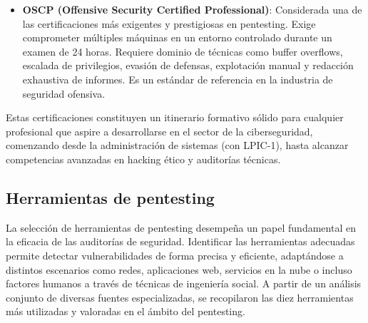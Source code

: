 \documentclass[a4paper, 10pt]{article}
\begin{document}
\begin{itemize}
            \item \textbf{OSCP (Offensive Security Certified Professional)}: Considerada una de las certificaciones más exigentes y prestigiosas en pentesting. Exige comprometer múltiples máquinas en un entorno controlado durante un examen de 24 horas. Requiere dominio de técnicas como buffer overflows, escalada de privilegios, evasión de defensas, explotación manual y redacción exhaustiva de informes. Es un estándar de referencia en la industria de seguridad ofensiva.
        \end{itemize}
        
        Estas certificaciones constituyen un itinerario formativo sólido para cualquier profesional que aspire a desarrollarse en el sector de la ciberseguridad, comenzando desde la administración de sistemas (con LPIC-1), hasta alcanzar competencias avanzadas en hacking ético y auditorías técnicas.
        
        

    \subsection{Herramientas de pentesting}

    La selección de herramientas de pentesting desempeña un papel fundamental en la eficacia de las auditorías de seguridad. Identificar las herramientas adecuadas permite detectar vulnerabilidades de forma precisa y eficiente, adaptándose a distintos escenarios 
    como redes, aplicaciones web, servicios en la nube o incluso factores humanos a través de técnicas de ingeniería social. A partir de un análisis conjunto de diversas fuentes especializadas, se recopilaron las diez herramientas 
    más utilizadas y valoradas en el ámbito del pentesting. \cite{felipe2024}
    
\end{document}
